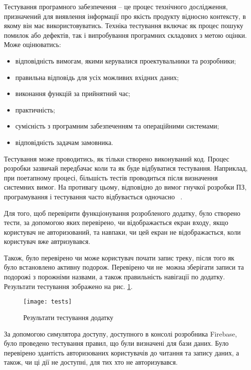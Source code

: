\documentclass[../main.tex]{subfiles}
\begin{document}
Тестування програмного забезпечення -- це процес технічного дослідження, призначений для виявлення інформації про якість продукту відносно контексту, в якому він має використовуватись. Техніка тестування включає як процес пошуку помилок або дефектів, так і випробування програмних складових з метою оцінки. Може оцінюватись:

\begin{itemize}[label={--}]
	\item відповідність вимогам, якими керувалися проектувальники та розробники;
	\item правильна відповідь для усіх можливих вхідних даних;
	\item виконання функцій за прийнятний час;
	\item практичність;
	\item сумісність з програмним забезпеченням та операційними системами;
	\item відповідність задачам замовника.
\end{itemize}

Тестування може проводитись, як тільки створено виконуваний код. Процес розробки зазвичай передбачає коли та як буде відбуватися тестування. Наприклад, при поетапному процесі, більшість тестів проводиться після визначення системних вимог. На противагу цьому, відповідно до вимог гнучкої розробки ПЗ, програмування і тестування часто відбувається одночасно~\cite{testing} .

Для того, щоб перевірити функціонування розробленого додатку, було створено тести, за допомогою яких перевірено, чи відображається екран входу, якщо користувач не авторизований, та навпаки, чи цей екран не відображається, коли користувач вже автризувався. 

Також, було перевірено чи може користувач почати запис треку, після того як було встановлено активну подорож. Перевірено чи не~можна зберігати записи та подорожі з порожніми назвами, а також правильність навігації по додатку. Результати тестування зображено на рис. \ref{figure:test_results}.

\begin{figure}[H]
	\centering
	\texttt{[image: tests]}
	\caption{Результати тестування додатку}
	\label{figure:test_results}
\end{figure}

За допомогою симулятора доступу, доступного в консолі розробника Firebase, було проведено тестування правил, що були визначені для бази даних. Було перевірено здантість авторизованих користувачів до читання та запису даних, а також, чи ці дії не доступні, для тих хто не авторизувався. 
\end{document}
